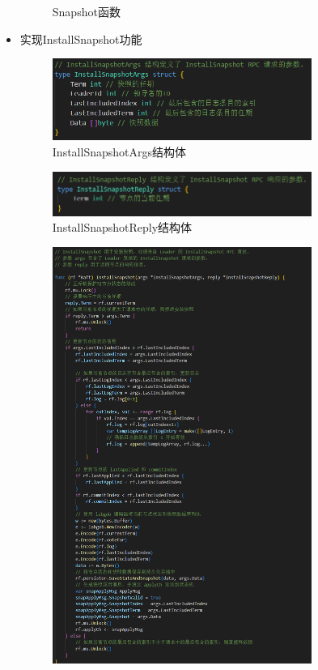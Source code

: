 \documentclass[]{article}
\begin{document}
\begin{itemize}
\begin{figure}[H]
			\caption{Snapshot函数}
		\end{figure}
		\item 实现InstallSnapshot功能
		\begin{figure}[H]
			\centering
			\includegraphics[width=0.8\textwidth]{./2D/InstallSnapshotArgs.png}
			\caption{InstallSnapshotArgs结构体}
		\end{figure}
		\begin{figure}[H]
			\centering
			\includegraphics[width=0.8\textwidth]{./2D/InstallSnapshotReply.png}
			\caption{InstallSnapshotReply结构体}
		\end{figure}
		\begin{figure}[H]
			\centering
			\includegraphics[width=0.8\textwidth]{./2D/InstallSnapshot.png}

\end{figure}
\end{itemize}
\end{document}
